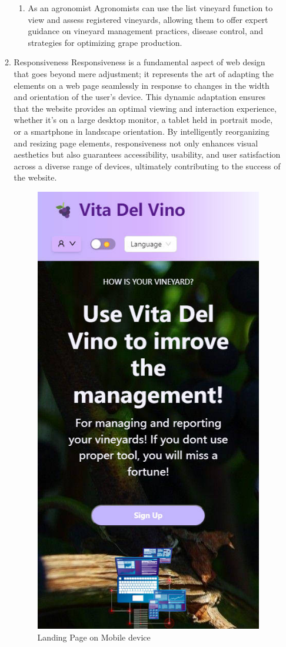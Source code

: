 \begin{enumerate}
\begin{enumerate}
\begin{enumerate}
                        \item As an agronomist
                              Agronomists can use the list vineyard function to view and assess registered vineyards, allowing them to offer expert guidance on vineyard management practices, disease control, and strategies for optimizing grape production.
                    \end{enumerate}
              \item Responsiveness
              Responsiveness is a fundamental aspect of web design that goes beyond mere adjustment; it represents the art of adapting the elements on a web page seamlessly in response to changes in the width and orientation of the user's device. This dynamic adaptation ensures that the website provides an optimal viewing and interaction experience, whether it's on a large desktop monitor, a tablet held in portrait mode, or a smartphone in landscape orientation. By intelligently reorganizing and resizing page elements, responsiveness not only enhances visual aesthetics but also guarantees accessibility, usability, and user satisfaction across a diverse range of devices, ultimately contributing to the success of the website. 
                \begin{figure}
                    \centering
                    \includegraphics[width=0.5\linewidth]{images/responsive.jpg}
                    \caption{Landing Page on Mobile device}
                    \label{fig:responsive}
                \end{figure}

          \end{enumerate}
\end{enumerate}

